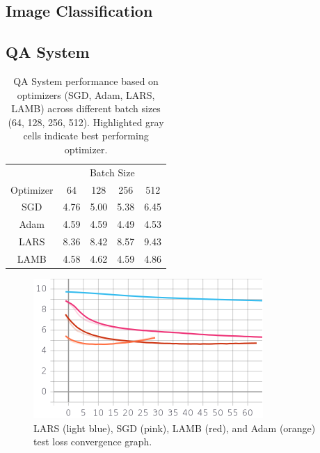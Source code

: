 \subsection{Image Classification}


\subsection{QA System}

\begin{table}[!t]
\vspace{-5pt}
\small
\vspace{7pt}
\caption{QA System performance based on optimizers (SGD, Adam, LARS, LAMB) across different batch sizes (64, 128, 256, 512). Highlighted gray cells indicate best performing optimizer.}\label{tbl:results}
\vspace{-10pt}
\begin{center}
\begin{tabular}{ c|c|c|c|c}
\multicolumn{1}{c|}{} &  \multicolumn{4}{c}{Batch Size}\\ \cline{2-5}
\multicolumn{1}{c|}{Optimizer} &
 \multicolumn{1}{c|}{64} &
 \multicolumn{1}{c|}{128} &
 \multicolumn{1}{c|}{256} &
 \multicolumn{1}{c}{512} \\
\hline
SGD & 4.76 & 5.00 & 5.38 & 6.45\\
Adam &  4.59 & \cellcolor{gray!30} 4.59 &  \cellcolor{gray!30} 4.49 & \cellcolor{gray!30} 4.53\\
LARS & 8.36 & 8.42 & 8.57 & 9.43\\
LAMB & \cellcolor{gray!30} 4.58 & 4.62 & 4.59 & 4.86\\
\end{tabular}
\end{center}
\vspace{-15pt}
\end{table}



\begin{figure}[!t]
    \centering
    \includegraphics[width=0.7\linewidth]{img/drqa_128_blars_oadam_psgd_rlamb.png}
    \caption{LARS (light blue), SGD (pink), LAMB (red), and Adam (orange) test loss convergence graph.}
    \label{fig:128}
\end{figure}

